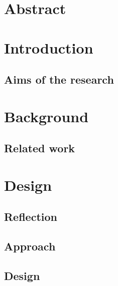 \documentclass[a4paper,15pt]{article}
\begin{document}




\newpage{}
\section{Abstract}
    

\renewcommand{\contentsname}{Table of contents}
\tableofcontents

\newpage{}

\section{Introduction}

    \subsection{Aims of the research}
    

\section{Background}

    
    \subsection{Related work}
    


\clearpage
\section{Design}


    \subsection{Reflection}
    
    
    \subsection{Approach}
    
    
    \subsection{Design}
    
    
\end{document}
